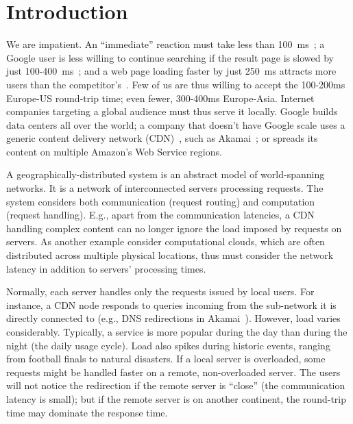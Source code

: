 \documentclass[11pt]{article}
\begin{document}
\newpage

\section{Introduction}\label{sec::introduction}

We are impatient. 
An ``immediate'' reaction must take less than 100~ms~\cite{card1983psychology};
a Google user is less willing to continue searching if the result page is slowed by just 100-400~ms~\cite{google2009:speed-matters};
and a web page loading faster by just 250~ms attracts more users than the competitor's~\cite{lohr2012impatient}.
Few of us are thus willing to accept the 100-200ms Europe-US round-trip time; even fewer, 300-400ms Europe-Asia.
Internet companies targeting a global audience must thus serve it locally. 
Google builds data centers all over the world; a company that doesn't have Google scale uses a generic content delivery network (CDN)~\cite{pallis2006content, freedman2010experiences}, such as Akamai~\cite{Nygren:2010:ANP:1842733.1842736, akamai2, draftingBehindAkamai}; or spreads its content on multiple Amazon's Web Service regions.

A geographically-distributed system is an abstract model of world-spanning networks. It is a network of interconnected servers processing requests. The system considers both communication (request routing) and computation (request handling). E.g., apart from the communication latencies, a CDN handling complex content can no longer ignore the load imposed by requests on servers. As another example consider computational clouds, which are often distributed across multiple physical locations, thus must consider the network latency in addition to servers' processing times.

Normally, each server handles only the requests issued by local users. For instance, a CDN node responds to queries incoming from the sub-network it is directly connected to (e.g., DNS redirections in Akamai~\cite{draftingBehindAkamai, akamai2, akamaiPatent}). 
However, load varies considerably. 
Typically, a service is more popular during the day than during the night (the daily usage cycle).
Load also spikes during historic events, ranging from football finals to natural disasters.
If a local server is overloaded, some requests might be handled faster on a remote, non-overloaded server.
The users will not notice the redirection if the remote server is ``close'' (the communication latency is small);
but if the remote server is on another continent, the round-trip time may dominate the response time.
\end{document}
